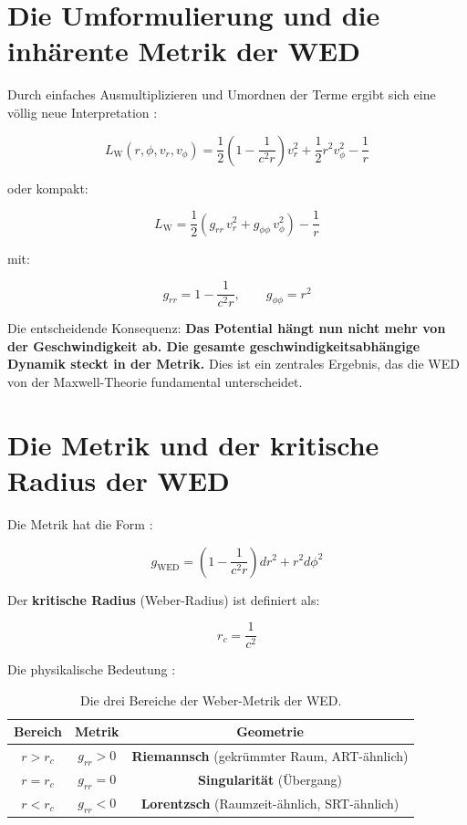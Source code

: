 \section{Die Umformulierung und die inhärente Metrik der WED}
\label{app:weber_metrik_umformulierung_wed}

Durch einfaches Ausmultiplizieren und Umordnen der Terme ergibt sich eine völlig neue Interpretation \cite{FrauenfelderWeber2024}:

\[
L_{\mathrm{W}}(r,\phi,v_r,v_\phi) = 
\frac{1}{2}\left(1 - \frac{1}{c^2r}\right) v_r^2 + \frac{1}{2} r^2 v_\phi^2 - \frac{1}{r}
\tag{M.2}
\]

oder kompakt:

\[
L_{\mathrm{W}} = \frac{1}{2}\left( g_{rr}\, v_r^2 + g_{\phi\phi}\, v_\phi^2 \right) - \frac{1}{r}
\tag{M.3}
\]

mit:

\[
g_{rr} = 1 - \frac{1}{c^2r}, \qquad g_{\phi\phi} = r^2
\tag{M.4}
\]

Die entscheidende Konsequenz: \textbf{Das Potential hängt nun nicht mehr von der Geschwindigkeit ab. Die gesamte geschwindigkeitsabhängige Dynamik steckt in der Metrik.} \cite{FrauenfelderWeber2024} Dies ist ein zentrales Ergebnis, das die WED von der Maxwell-Theorie fundamental unterscheidet.

\section{Die Metrik und der kritische Radius der WED}
\label{app:weber_metrik_metrik_wed}

Die Metrik hat die Form \cite{FrauenfelderWeber2024}:

\[
g_{\text{WED}} = \left(1 - \frac{1}{c^2r}\right) dr^2 + r^2 d\phi^2
\tag{M.5}
\]

Der \textbf{kritische Radius} (Weber-Radius) ist definiert als:

\[
r_c = \frac{1}{c^2}
\tag{M.6}
\]

Die physikalische Bedeutung \cite{FrauenfelderWeber2024}:

\begin{table}[htbp]
\centering
\begin{tabular}{|c|c|c|}
\hline
\textbf{Bereich} & \textbf{Metrik} & \textbf{Geometrie} \\
\hline
\( r > r_c \) & \( g_{rr} > 0 \) & \textbf{Riemannsch} (gekrümmter Raum, ART-ähnlich) \\
\hline
\( r = r_c \) & \( g_{rr} = 0 \) & \textbf{Singularität} (Übergang) \\
\hline
\( r < r_c \) & \( g_{rr} < 0 \) & \textbf{Lorentzsch} (Raumzeit-ähnlich, SRT-ähnlich) \\
\hline
\end{tabular}
\caption{Die drei Bereiche der Weber-Metrik der WED.}
\label{tab:weber_metrik_bereiche_wed}
\end{table}

